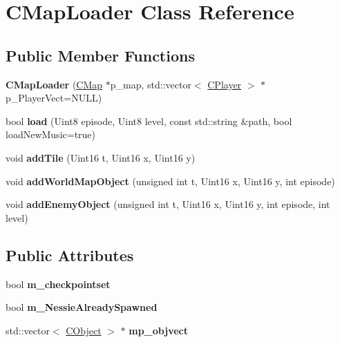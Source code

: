 \hypertarget{class_c_map_loader}{
\section{CMapLoader Class Reference}
\label{class_c_map_loader}
}
\subsection*{Public Member Functions}
\begin{DoxyCompactItemize}
\item 
\hypertarget{class_c_map_loader_a1401614075ce24f5581091424eecc899}{
{\bfseries CMapLoader} (\hyperlink{class_c_map}{CMap} $\ast$p\_\-map, std::vector$<$ \hyperlink{class_c_player}{CPlayer} $>$ $\ast$p\_\-PlayerVect=NULL)}
\label{class_c_map_loader_a1401614075ce24f5581091424eecc899}

\item 
\hypertarget{class_c_map_loader_aec750f91ea702e16a54127150a76e8ff}{
bool {\bfseries load} (Uint8 episode, Uint8 level, const std::string \&path, bool loadNewMusic=true)}
\label{class_c_map_loader_aec750f91ea702e16a54127150a76e8ff}

\item 
\hypertarget{class_c_map_loader_a69f81279340f03535589a0f625bd823a}{
void {\bfseries addTile} (Uint16 t, Uint16 x, Uint16 y)}
\label{class_c_map_loader_a69f81279340f03535589a0f625bd823a}

\item 
\hypertarget{class_c_map_loader_a7786ff4a78fc3d09272ebcc3af86f5ae}{
void {\bfseries addWorldMapObject} (unsigned int t, Uint16 x, Uint16 y, int episode)}
\label{class_c_map_loader_a7786ff4a78fc3d09272ebcc3af86f5ae}

\item 
\hypertarget{class_c_map_loader_aaa91eaba3590eda52016f853d05c7a61}{
void {\bfseries addEnemyObject} (unsigned int t, Uint16 x, Uint16 y, int episode, int level)}
\label{class_c_map_loader_aaa91eaba3590eda52016f853d05c7a61}

\end{DoxyCompactItemize}
\subsection*{Public Attributes}
\begin{DoxyCompactItemize}
\item 
\hypertarget{class_c_map_loader_a41707f2a7f032d5e0a595a6f58bea26d}{
bool {\bfseries m\_\-checkpointset}}
\label{class_c_map_loader_a41707f2a7f032d5e0a595a6f58bea26d}

\item 
\hypertarget{class_c_map_loader_a92f10cee4695f866845f7c8db146633a}{
bool {\bfseries m\_\-NessieAlreadySpawned}}
\label{class_c_map_loader_a92f10cee4695f866845f7c8db146633a}

\item 
\hypertarget{class_c_map_loader_a76954e66dffa271c39f63d64fe45de72}{
std::vector$<$ \hyperlink{class_c_object}{CObject} $>$ $\ast$ {\bfseries mp\_\-objvect}}
\label{class_c_map_loader_a76954e66dffa271c39f63d64fe45de72}

\end{DoxyCompactItemize}


